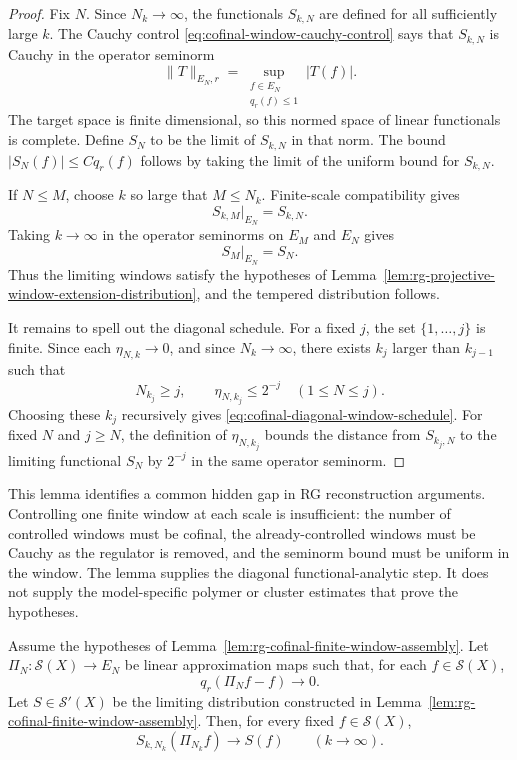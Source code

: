 \begin{proof}
Fix \(N\).  Since \(N_k\to\infty\), the functionals \(S_{k,N}\) are defined
for all sufficiently large \(k\).  The Cauchy control
\eqref{eq:cofinal-window-cauchy-control} says that \(S_{k,N}\) is Cauchy in
the operator seminorm
\[
  \|T\|_{E_N,r}
  =
  \sup_{\substack{f\in E_N\\ q_r(f)\le1}} |T(f)|.
\]
The target space is finite dimensional, so this normed space of linear
functionals is complete.  Define \(S_N\) to be the limit of \(S_{k,N}\) in
that norm.  The bound \(|S_N(f)|\le Cq_r(f)\) follows by taking the limit of
the uniform bound for \(S_{k,N}\).

If \(N\le M\), choose \(k\) so large that \(M\le N_k\).  Finite-scale
compatibility gives
\[
  S_{k,M}|_{E_N}=S_{k,N}.
\]
Taking \(k\to\infty\) in the operator seminorms on \(E_M\) and \(E_N\) gives
\[
  S_M|_{E_N}=S_N .
\]
Thus the limiting windows satisfy the hypotheses of
Lemma~\ref{lem:rg-projective-window-extension-distribution}, and the
tempered distribution follows.

It remains to spell out the diagonal schedule.  For a fixed \(j\), the set
\(\{1,\ldots,j\}\) is finite.  Since each \(\eta_{N,k}\to0\), and since
\(N_k\to\infty\), there exists \(k_j\) larger than \(k_{j-1}\) such that
\[
  N_{k_j}\ge j,\qquad
  \eta_{N,k_j}\le2^{-j}\quad(1\le N\le j).
\]
Choosing these \(k_j\) recursively gives
\eqref{eq:cofinal-diagonal-window-schedule}.  For fixed \(N\) and
\(j\ge N\), the definition of \(\eta_{N,k_j}\) bounds the distance from
\(S_{k_j,N}\) to the limiting functional \(S_N\) by \(2^{-j}\) in the same
operator seminorm.
\end{proof}

This lemma identifies a common hidden gap in RG reconstruction arguments.
Controlling one finite window at each scale is insufficient: the number of
controlled windows must be cofinal, the already-controlled windows must be
Cauchy as the regulator is removed, and the seminorm bound must be uniform in
the window.  The lemma supplies the diagonal functional-analytic step.  It
does not supply the model-specific polymer or cluster estimates that prove
the hypotheses.

\begin{lemma}
\label{lem:rg-moving-window-fixed-test-approximation}
Assume the hypotheses of
Lemma~\ref{lem:rg-cofinal-finite-window-assembly}.  Let
\(\Pi_N:\mathcal S(X)\to E_N\) be linear approximation maps such that, for
each \(f\in\mathcal S(X)\),
\[
  q_r(\Pi_N f-f)\longrightarrow0 .
\]
Let \(S\in\mathcal S'(X)\) be the limiting distribution constructed in
Lemma~\ref{lem:rg-cofinal-finite-window-assembly}.  Then, for every fixed
\(f\in\mathcal S(X)\),
\begin{equation}
  S_{k,N_k}(\Pi_{N_k}f)\longrightarrow S(f)
  \qquad (k\to\infty).
  \label{eq:moving-window-fixed-test-convergence}
\end{equation}
\end{lemma}

